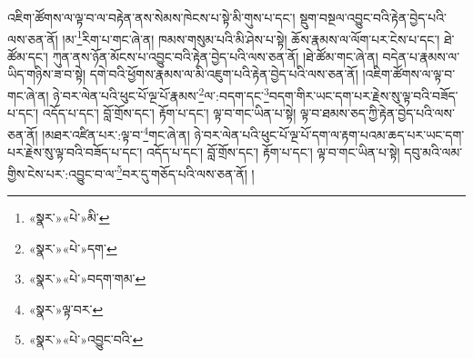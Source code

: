 འཇིག་ཚོགས་ལ་ལྟ་བ་ལ་བརྟེན་ནས་སེམས་ཁེངས་པ་སྟེ་མི་གུས་པ་དང་། སྡུག་བསྔལ་འབྱུང་བའི་རྟེན་བྱེད་པའི་ལས་ཅན་ནོ། །མ་\footnote{«སྣར་»«པེ་»མི་}རིག་པ་གང་ཞེ་ན། ཁམས་གསུམ་པའི་མི་ཤེས་པ་སྟེ། ཆོས་རྣམས་ལ་ལོག་པར་ངེས་པ་དང་། ཐེ་ཚོམ་དང་། ཀུན་ནས་ཉོན་མོངས་པ་འབྱུང་བའི་རྟེན་བྱེད་པའི་ལས་ཅན་ནོ། །ཐེ་ཚོམ་གང་ཞེ་ན། བདེན་པ་རྣམས་ལ་ཡིད་གཉིས་ཟ་བ་སྟེ། དགེ་བའི་ཕྱོགས་རྣམས་ལ་མི་འཇུག་པའི་རྟེན་བྱེད་པའི་ལས་ཅན་ནོ། །འཇིག་ཚོགས་ལ་ལྟ་བ་གང་ཞེ་ན། ཉེ་བར་ལེན་པའི་ཕུང་པོ་ལྔ་པོ་རྣམས་\footnote{«སྣར་»«པེ་»དག་}ལ་:བདག་དང་\footnote{«སྣར་»«པེ་»བདག་གམ་}བདག་གིར་ཡང་དག་པར་རྗེས་སུ་ལྟ་བའི་བཟོད་པ་དང་། འདོད་པ་དང་། བློ་གྲོས་དང་། རྟོག་པ་དང་། ལྟ་བ་གང་ཡིན་པ་སྟེ། ལྟ་བ་ཐམས་ཅད་ཀྱི་རྟེན་བྱེད་པའི་ལས་ཅན་ནོ། །མཐར་འཛིན་པར་:ལྟ་བ་\footnote{«སྣར་»ལྟ་བར་}གང་ཞེ་ན། ཉེ་བར་ལེན་པའི་ཕུང་པོ་ལྔ་པོ་དག་ལ་རྟག་པའམ་ཆད་པར་ཡང་དག་པར་རྗེས་སུ་ལྟ་བའི་བཟོད་པ་དང་། འདོད་པ་དང་། བློ་གྲོས་དང་། རྟོག་པ་དང་། ལྟ་བ་གང་ཡིན་པ་སྟེ། དབུ་མའི་ལམ་གྱིས་ངེས་པར་:འབྱུང་བ་ལ་\footnote{«སྣར་»«པེ་»འབྱུང་བའི་}བར་དུ་གཅོད་པའི་ལས་ཅན་ནོ། །
